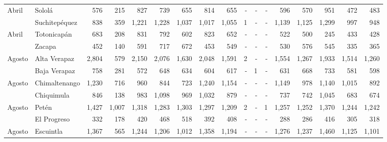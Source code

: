 \begin{landscape}
\begin{center}
\begin{longtable}{llrrrrrrrrrrrrrrr}
			\multicolumn{1}{l}{	\footnotesize	 Abril 	}&	 Sololá 	&	 576 	&	 215 	&	 827 	&	 739 	&	 655 	&	 814 	&	 655 	&	 -   	&	 -   	&	 -   	&	 596 	&	 570 	&	 951 	&	 472 	&	 483 	\\
			\rowcolor{color1!5!white}\multicolumn{1}{l}{	\footnotesize	 Abril 	}&	 Suchitepéquez 	&	 838 	&	 359 	&	 1,221 	&	 1,228 	&	 1,037 	&	 1,017 	&	 1,055 	&	 1 	&	 -   	&	 -   	&	 1,139 	&	 1,125 	&	 1,299 	&	 997 	&	 948 	\\
			\multicolumn{1}{l}{	\footnotesize	 Abril 	}&	 Totonicapán 	&	 683 	&	 208 	&	 831 	&	 792 	&	 602 	&	 823 	&	 652 	&	 -   	&	 -   	&	 -   	&	 522 	&	 500 	&	 245 	&	 433 	&	 428 	\\
			\rowcolor{color1!5!white}\multicolumn{1}{l}{	\footnotesize	 Abril 	}&	 Zacapa 	&	 452 	&	 140 	&	 591 	&	 717 	&	 672 	&	 453 	&	 549 	&	 -   	&	 -   	&	 -   	&	 530 	&	 576 	&	 545 	&	 335 	&	 365 	\\
			\multicolumn{1}{l}{	\footnotesize	 Agosto 	}&	 Alta Verapaz 	&	 2,804 	&	 579 	&	 2,150 	&	 2,076 	&	 1,630 	&	 2,048 	&	 1,591 	&	 2 	&	 -   	&	 -   	&	 1,554 	&	 1,267 	&	 1,933 	&	 1,514 	&	 1,260 	\\
			\rowcolor{color1!5!white}\multicolumn{1}{l}{	\footnotesize	 Agosto 	}&	 Baja Verapaz 	&	 758 	&	 281 	&	 572 	&	 648 	&	 634 	&	 604 	&	 617 	&	 -   	&	 1 	&	 -   	&	 631 	&	 668 	&	 733 	&	 581 	&	 598 	\\
			\multicolumn{1}{l}{	\footnotesize	 Agosto 	}&	 Chimaltenango 	&	 1,230 	&	 716 	&	 960 	&	 844 	&	 723 	&	 1,240 	&	 1,154 	&	 -   	&	 -   	&	 -   	&	 1,149 	&	 978 	&	 1,140 	&	 1,015 	&	 892 	\\
			\rowcolor{color1!5!white}\multicolumn{1}{l}{	\footnotesize	 Agosto 	}&	 Chiquimula 	&	 846 	&	 138 	&	 983 	&	 1,098 	&	 969 	&	 1,032 	&	 879 	&	 -   	&	 -   	&	 -   	&	 737 	&	 742 	&	 1,045 	&	 683 	&	 674 	\\
			\multicolumn{1}{l}{	\footnotesize	 Agosto 	}&	 Petén 	&	 1,427 	&	 1,007 	&	 1,318 	&	 1,283 	&	 1,303 	&	 1,297 	&	 1,209 	&	 2 	&	 -   	&	 1 	&	 1,257 	&	 1,252 	&	 1,370 	&	 1,244 	&	 1,242 	\\
			\rowcolor{color1!5!white}\multicolumn{1}{l}{	\footnotesize	 Agosto 	}&	 El Progreso 	&	 332 	&	 178 	&	 420 	&	 468 	&	 518 	&	 392 	&	 408 	&	 -   	&	 -   	&	 -   	&	 288 	&	 286 	&	 416 	&	 305 	&	 318 	\\
			\multicolumn{1}{l}{	\footnotesize	 Agosto 	}&	 Escuintla 	&	 1,367 	&	 565 	&	 1,244 	&	 1,206 	&	 1,012 	&	 1,358 	&	 1,194 	&	 -   	&	 -   	&	 -   	&	 1,276 	&	 1,237 	&	 1,460 	&	 1,125 	&	 1,101 	\\

\end{longtable}
\end{center}
\end{landscape}
